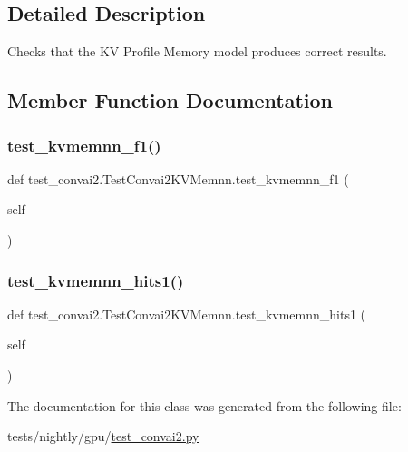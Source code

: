 \subsection{Detailed Description}
\begin{DoxyVerb}Checks that the KV Profile Memory model produces correct results.
\end{DoxyVerb}
 

\subsection{Member Function Documentation}
\mbox{\label{classtest__convai2_1_1TestConvai2KVMemnn_a85c9f140bc57a1f1e8b011a2034e74fc}} 
\subsubsection{\texorpdfstring{test\+\_\+kvmemnn\+\_\+f1()}{test\_kvmemnn\_f1()}}
{\footnotesize\ttfamily def test\+\_\+convai2.\+Test\+Convai2\+K\+V\+Memnn.\+test\+\_\+kvmemnn\+\_\+f1 (\begin{DoxyParamCaption}\item[{}]{self }\end{DoxyParamCaption})}

\mbox{\label{classtest__convai2_1_1TestConvai2KVMemnn_a8d4b821e481c61a125658e0ac5045762}} 
\subsubsection{\texorpdfstring{test\+\_\+kvmemnn\+\_\+hits1()}{test\_kvmemnn\_hits1()}}
{\footnotesize\ttfamily def test\+\_\+convai2.\+Test\+Convai2\+K\+V\+Memnn.\+test\+\_\+kvmemnn\+\_\+hits1 (\begin{DoxyParamCaption}\item[{}]{self }\end{DoxyParamCaption})}



The documentation for this class was generated from the following file\+:\begin{DoxyCompactItemize}
\item 
tests/nightly/gpu/\hyperlink{test__convai2_8py}{test\+\_\+convai2.\+py}\end{DoxyCompactItemize}
